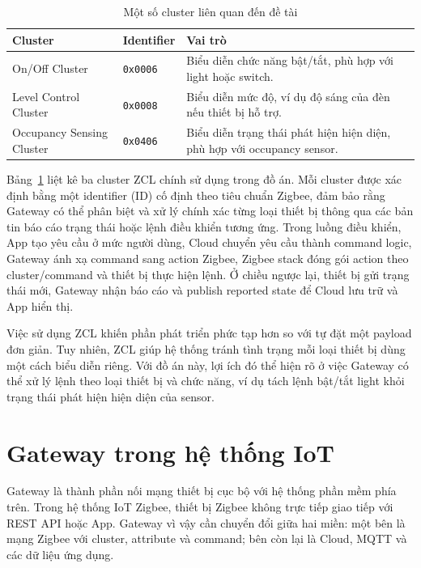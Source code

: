 \begin{table}[H]
\centering
\caption{Một số cluster liên quan đến đề tài}
\label{tab:ch2-zcl-clusters}
\begin{tabular}{|>{\raggedright\arraybackslash}p{4cm}|>{\raggedright\arraybackslash}p{3cm}|>{\raggedright\arraybackslash}p{6cm}|}
\hline
\textbf{Cluster} & \textbf{Identifier} & \textbf{Vai trò} \\ \hline
On/Off Cluster & \texttt{0x0006} & Biểu diễn chức năng bật/tắt, phù hợp với light hoặc switch. \\ \hline
Level Control Cluster & \texttt{0x0008} & Biểu diễn mức độ, ví dụ độ sáng của đèn nếu thiết bị hỗ trợ. \\ \hline
Occupancy Sensing Cluster & \texttt{0x0406} & Biểu diễn trạng thái phát hiện hiện diện, phù hợp với occupancy sensor. \\ \hline
\end{tabular}
\end{table}

Bảng~\ref{tab:ch2-zcl-clusters} liệt kê ba cluster ZCL chính sử dụng trong đồ án. Mỗi cluster được xác định bằng một identifier (ID) cố định theo tiêu chuẩn Zigbee, đảm bảo rằng Gateway có thể phân biệt và xử lý chính xác từng loại thiết bị thông qua các bản tin báo cáo trạng thái hoặc lệnh điều khiển tương ứng. Trong luồng điều khiển, App tạo yêu cầu ở mức người dùng, Cloud chuyển yêu cầu thành command logic, Gateway ánh xạ command sang action Zigbee, Zigbee stack đóng gói action theo cluster/command và thiết bị thực hiện lệnh. Ở chiều ngược lại, thiết bị gửi trạng thái mới, Gateway nhận báo cáo và publish reported state để Cloud lưu trữ và App hiển thị.

Việc sử dụng ZCL khiến phần phát triển phức tạp hơn so với tự đặt một payload đơn giản. Tuy nhiên, ZCL giúp hệ thống tránh tình trạng mỗi loại thiết bị dùng một cách biểu diễn riêng. Với đồ án này, lợi ích đó thể hiện rõ ở việc Gateway có thể xử lý lệnh theo loại thiết bị và chức năng, ví dụ tách lệnh bật/tắt light khỏi trạng thái phát hiện hiện diện của sensor.

\section{Gateway trong hệ thống IoT}
\label{sec:ch2-gateway}

Gateway là thành phần nối mạng thiết bị cục bộ với hệ thống phần mềm phía trên. Trong hệ thống IoT Zigbee, thiết bị Zigbee không trực tiếp giao tiếp với REST API hoặc App. Gateway vì vậy cần chuyển đổi giữa hai miền: một bên là mạng Zigbee với cluster, attribute và command; bên còn lại là Cloud, MQTT và các dữ liệu ứng dụng.

